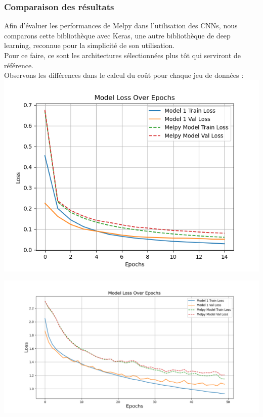 \begin{multicols}{2}
\subsubsection{Comparaison des résultats}

Afin d’évaluer les performances de Melpy dans l’utilisation des CNNs, nous comparons cette bibliothèque avec Keras, une autre bibliothèque de deep learning, reconnue pour la simplicité de son utilisation. \\

Pour ce faire, ce sont les architectures sélectionnées plus tôt qui serviront de référence.\\

Observons les différences dans le calcul du coût pour chaque jeu de données : \\

\includegraphics[width=\columnwidth]{images/mnist_comparison.png}
\hfill\break


\includegraphics[width=\columnwidth]{images/cifar10_losses_comparison.png}
\hfill\break


\end{multicols}
